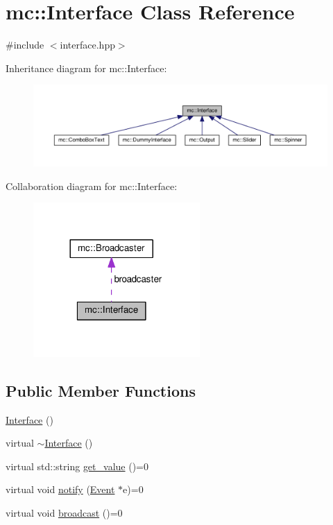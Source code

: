 \hypertarget{classmc_1_1Interface}{}\section{mc\+:\+:Interface Class Reference}
\label{classmc_1_1Interface}


{\ttfamily \#include $<$interface.\+hpp$>$}



Inheritance diagram for mc\+:\+:Interface\+:\nopagebreak
\begin{figure}[H]
\begin{center}
\leavevmode
\includegraphics[width=350pt]{classmc_1_1Interface__inherit__graph}
\end{center}
\end{figure}


Collaboration diagram for mc\+:\+:Interface\+:\nopagebreak
\begin{figure}[H]
\begin{center}
\leavevmode
\includegraphics[width=180pt]{classmc_1_1Interface__coll__graph}
\end{center}
\end{figure}
\subsection*{Public Member Functions}
\begin{DoxyCompactItemize}
\item 
\hyperlink{classmc_1_1Interface_ad6af075feefe2afc9578724dd8ef2343}{Interface} ()
\item 
virtual \hyperlink{classmc_1_1Interface_a5d28302e778fd71f760cba7005b66b9f}{$\sim$\+Interface} ()
\item 
virtual std\+::string \hyperlink{classmc_1_1Interface_af8054c8af251199c9d142ce94182c5f5}{get\+\_\+value} ()=0
\item 
virtual void \hyperlink{classmc_1_1Interface_a6a08326bd2ad5d40fe0427e97cebfbb6}{notify} (\hyperlink{classmc_1_1Event}{Event} $\ast$e)=0
\item 
virtual void \hyperlink{classmc_1_1Interface_af91ff5ec779e5af49bf798d5f6331b80}{broadcast} ()=0
\end{DoxyCompactItemize}
